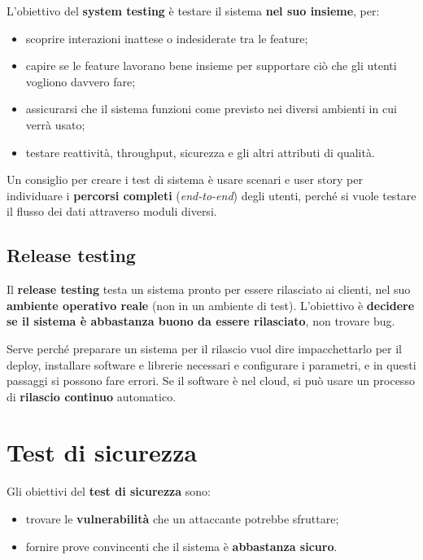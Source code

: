 L'obiettivo del \textbf{system testing} è testare il sistema \textbf{nel
suo insieme}, per:

\begin{itemize}
\tightlist
\item
  scoprire interazioni inattese o indesiderate tra le feature;
\item
  capire se le feature lavorano bene insieme per supportare ciò che gli
  utenti vogliono davvero fare;
\item
  assicurarsi che il sistema funzioni come previsto nei diversi ambienti
  in cui verrà usato;
\item
  testare reattività, throughput, sicurezza e gli altri attributi di
  qualità.
\end{itemize}

Un consiglio per creare i test di sistema è usare scenari e user story
per individuare i \textbf{percorsi completi} (\emph{end-to-end}) degli
utenti, perché si vuole testare il flusso dei dati attraverso moduli
diversi.

\subsection{Release testing}\label{release-testing}

Il \textbf{release testing} testa un sistema pronto per essere
rilasciato ai clienti, nel suo \textbf{ambiente operativo reale} (non in
un ambiente di test). L'obiettivo è \textbf{decidere se il sistema è
abbastanza buono da essere rilasciato}, non trovare bug.

Serve perché preparare un sistema per il rilascio vuol dire
impacchettarlo per il deploy, installare software e librerie necessari e
configurare i parametri, e in questi passaggi si possono fare errori. Se
il software è nel cloud, si può usare un processo di \textbf{rilascio
continuo} automatico.

\section{Test di sicurezza}\label{test-di-sicurezza}

Gli obiettivi del \textbf{test di sicurezza} sono:

\begin{itemize}
\tightlist
\item
  trovare le \textbf{vulnerabilità} che un attaccante potrebbe
  sfruttare;
\item
  fornire prove convincenti che il sistema è \textbf{abbastanza sicuro}.
\end{itemize}

